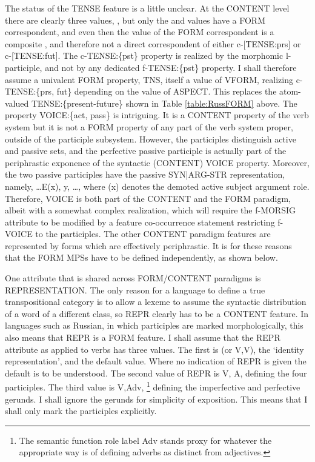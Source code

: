 \documentclass[output=paper,
modfonts
]{LSP/langsci}
\begin{document}
The status of the TENSE feature is a little unclear. At the CONTENT level there are clearly three values, , but only the  and  values have a FORM correspondent, and even then the value of the FORM correspondent is a composite , and therefore not a direct correspondent of either c-[TENSE:prs] or c-[TENSE:fut]. The c-TENSE:\{pst\} property is realized by the morphomic l-participle, and not by any dedicated f-TENSE:\{pst\} property. I shall therefore assume a univalent FORM property, TNS, itself a value of VFORM, realizing c-TENSE:\{prs, fut\} depending on the value of ASPECT. %
This replaces the atom-valued TENSE:\{present-future\} shown in Table \ref{table:RussFORM} above. %
The property VOICE:\{act, pass\} is intriguing. It is a CONTENT property of the verb system but it is not a FORM property of any part of the verb system proper, outside of the participle subsystem. However, the participles distinguish active and passive sets, and the perfective passive participle is actually part of the periphrastic exponence of the syntactic (CONTENT) VOICE property. Moreover, the two passive participles have the passive SYN|ARG-STR representation, namely, \ldots\lab E\lab(x), y, \dots\rab, where (x) denotes the demoted active subject argument role. Therefore, VOICE is both part of the CONTENT and the FORM paradigm, albeit with a somewhat complex realization, which will require the f-MORSIG attribute to be modified by a feature co-occurrence statement restricting f-VOICE to the participles. %
The other CONTENT paradigm features are represented by forms which are effectively periphrastic. It is for these reasons  that the FORM MPSs have to be defined independently, as shown below. 
 
 One attribute that is shared across FORM/CONTENT paradigms is REPRESENTATION. The only reason for a language to define a true transpositional category is to allow a lexeme to assume the syntactic distribution of a word of a different class, so REPR clearly has to be a CONTENT feature. In languages such as Russian, in which participles are marked morphologically, this also means that REPR is a FORM feature. %
 I shall assume that the REPR attribute as applied to verbs has three values. The first is  (or \lab V,V\rab), the ‘identity representation’, and the default value. Where no indication of REPR is given the default is to be understood.  The second value of REPR is \lab V, A\rab, defining the four participles.   %
 The third value is \lab V,Adv\rab,%
 \footnote{The semantic function role label Adv stands proxy for whatever the appropriate way is of defining adverbs as distinct from adjectives.} %
defining the imperfective and perfective gerunds. I shall ignore the gerunds for simplicity of exposition. This means that I shall only mark the participles explicitly.
\end{document}

